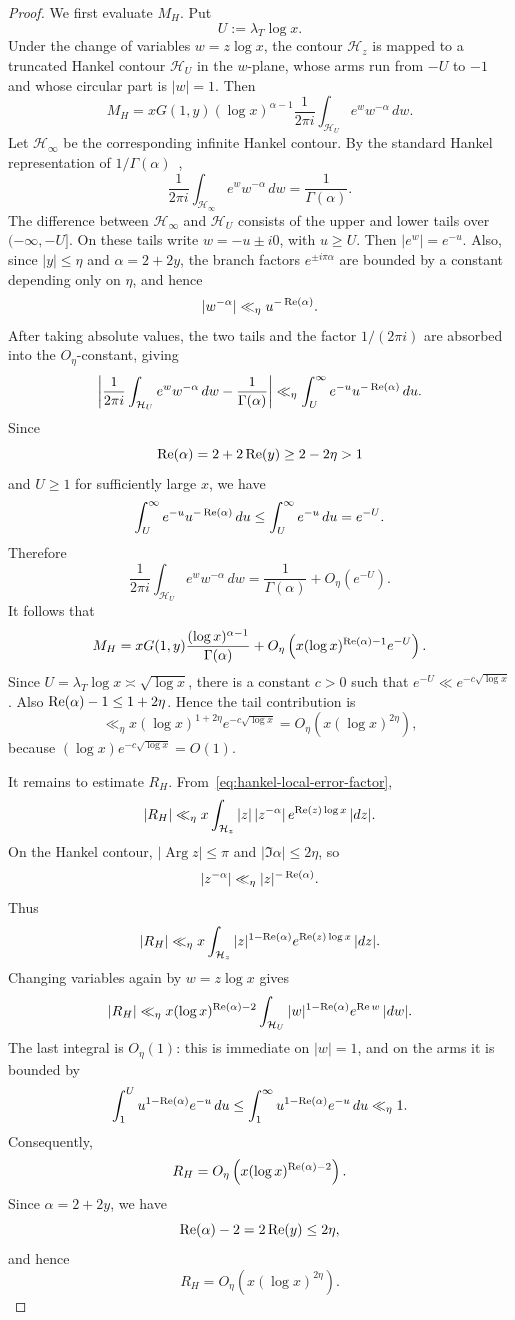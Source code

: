 \begin{proof}
We first evaluate $M_H$. Put
\[
    U:=\lambda_T\log x.
\]
Under the change of variables $w=z\log x$, the contour
$\mathcal H_z$ is mapped to a truncated Hankel contour
$\mathcal H_U$ in the $w$-plane, whose arms run from $-U$ to
$-1$ and whose circular part is $|w|=1$. Then
\[
    M_H
    =
    xG(1,y)(\log x)^{\alpha-1}
    \frac1{2\pi i}
    \int_{\mathcal H_U}e^w w^{-\alpha}\,dw.
\]
Let $\mathcal H_\infty$ be the corresponding infinite Hankel
contour. By the standard Hankel representation of
$1/\Gamma(\alpha)$~\cite[pp.~183--184]{Tenenbaum1995},
\[
    \frac1{2\pi i}
    \int_{\mathcal H_\infty}e^w w^{-\alpha}\,dw
    =
    \frac1{\Gamma(\alpha)}.
\]
The difference between $\mathcal H_\infty$ and $\mathcal H_U$
consists of the upper and lower tails over $(-\infty,-U]$. On
these tails write $w=-u\pm i0$, with $u\geq U$. Then
$|e^w|=e^{-u}$. Also, since $|y|\leq\eta$ and
$\alpha=2+2y$, the branch factors $e^{\pm i\pi\alpha}$ are
bounded by a constant depending only on $\eta$, and hence
\[
    |w^{-\alpha}|\ll_\eta u^{-\operatorname{Re}(\alpha)}.
\]
After taking absolute values, the two tails and the factor
$1/(2\pi i)$ are absorbed into the $O_\eta$-constant, giving
\[
    \left|
    \frac1{2\pi i}
    \int_{\mathcal H_U}e^w w^{-\alpha}\,dw
    -
    \frac1{\Gamma(\alpha)}
    \right|
    \ll_\eta
    \int_U^\infty e^{-u}u^{-\operatorname{Re}(\alpha)}\,du.
\]
Since
\[
    \operatorname{Re}(\alpha)=2+2\operatorname{Re}(y)\geq2-2\eta>1
\]
and $U\geq1$ for sufficiently large $x$, we have
\[
    \int_U^\infty e^{-u}u^{-\operatorname{Re}(\alpha)}\,du
    \leq
    \int_U^\infty e^{-u}\,du
    =
    e^{-U}.
\]
Therefore
\[
    \frac1{2\pi i}
    \int_{\mathcal H_U}e^w w^{-\alpha}\,dw
    =
    \frac1{\Gamma(\alpha)}
    +O_\eta(e^{-U}).
\]
It follows that
\[
    M_H
    =
    xG(1,y)\frac{(\log x)^{\alpha-1}}{\Gamma(\alpha)}
    +O_\eta\left(
        x(\log x)^{\operatorname{Re}(\alpha)-1}
        e^{-U}
    \right).
\]
Since $U=\lambda_T\log x\asymp\sqrt{\log x}$, there is a constant
$c>0$ such that $e^{-U}\ll e^{-c\sqrt{\log x}}$. Also
$\operatorname{Re}(\alpha)-1\leq1+2\eta$. Hence the tail contribution is
\[
    \ll_\eta
    x(\log x)^{1+2\eta}e^{-c\sqrt{\log x}}
    =
    O_\eta\left(x(\log x)^{2\eta}\right),
\]
because $(\log x)e^{-c\sqrt{\log x}}=O(1)$.

It remains to estimate $R_H$. From~\eqref{eq:hankel-local-error-factor},
\[
    |R_H|
    \ll_\eta
    x\int_{\mathcal H_z}
    |z|\,|z^{-\alpha}|\,e^{\operatorname{Re}(z)\log x}\,|dz|.
\]
On the Hankel contour, $|\operatorname{Arg}z|\leq\pi$ and
$|\Im\alpha|\leq2\eta$, so
\[
    |z^{-\alpha}|\ll_\eta |z|^{-\operatorname{Re}(\alpha)}.
\]
Thus
\[
    |R_H|
    \ll_\eta
    x\int_{\mathcal H_z}
    |z|^{1-\operatorname{Re}(\alpha)}e^{\operatorname{Re}(z)\log x}\,|dz|.
\]
Changing variables again by $w=z\log x$ gives
\[
    |R_H|
    \ll_\eta
    x(\log x)^{\operatorname{Re}(\alpha)-2}
    \int_{\mathcal H_U}
    |w|^{1-\operatorname{Re}(\alpha)}e^{\operatorname{Re} w}\,|dw|.
\]
The last integral is $O_\eta(1)$: this is immediate on $|w|=1$,
and on the arms it is bounded by
\[
    \int_1^U u^{1-\operatorname{Re}(\alpha)}e^{-u}\,du
    \leq
    \int_1^\infty u^{1-\operatorname{Re}(\alpha)}e^{-u}\,du
    \ll_\eta 1.
\]
Consequently,
\[
    R_H=O_\eta\left(x(\log x)^{\operatorname{Re}(\alpha)-2}\right).
\]
Since $\alpha=2+2y$, we have
\[
    \operatorname{Re}(\alpha)-2=2\operatorname{Re}(y)\leq2\eta,
\]
and hence
\[
    R_H=O_\eta(x(\log x)^{2\eta}).
\]


\end{proof}
